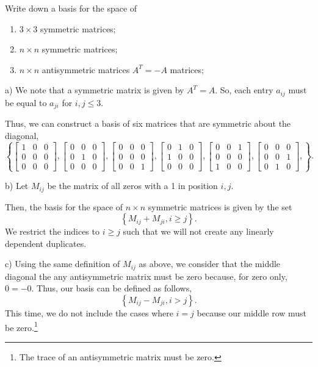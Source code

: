 \documentclass[../hw1]{subfiles}
\begin{document}
Write down a basis for the space of
\begin{enumerate}[label= (\alph*)]
  \item $3\times 3$ symmetric matrices;
  \item $n\times n$ symmetric matrices;
  \item $n\times n$ antisymmetric matrices $A ^{T} = -A$ matrices;
\end{enumerate}

a) We note that a symmetric matrix is given by $A ^{T} = A$.
So, each entry $a_{ij}$ must be equal to $a_{ji}$ for $i,j \le 3$.

Thus, we can construct a basis of six matrices that are symmetric about the diagonal,
\[
  \left\{ 
    \begin{bmatrix} 1&0&0\\0&0&0\\0&0&0 \end{bmatrix}, 
    \begin{bmatrix} 0&0&0\\0&1&0\\0&0&0 \end{bmatrix},
    \begin{bmatrix} 0&0&0\\0&0&0\\0&0&1 \end{bmatrix},
    \begin{bmatrix} 0&1&0\\1&0&0\\0&0&0 \end{bmatrix},
    \begin{bmatrix} 0&0&1\\0&0&0\\1&0&0 \end{bmatrix},
    \begin{bmatrix} 0&0&0\\0&0&1\\0&1&0 \end{bmatrix},
  \right\}
.\] 

b) Let $M_{ij}$ be the matrix of all zeros with a 1 in position $i,j$.

Then, the basis for the space of $n\times n$ symmetric matrices is given by the set \[
  \left\{ M_{ij}+M_{ji}, i \ge j \right\}
.\] We restrict the indices to $i \ge j$ such that we will not create any linearly dependent duplicates.

c) Using the same definition of $M_{ij}$ as above, we consider that the middle diagonal the any antisymmetric matrix must be zero because, for zero only, $0=-0$. Thus, our basis can be defined as follows,  \[
\left\{ M_{ij} - M_{ji}, i > j \right\}
.\]  This time, we do not include the cases where $i=j$ because our middle row must be zero.\footnote{The trace of an antisymmetric matrix must be zero.}
\end{document}
